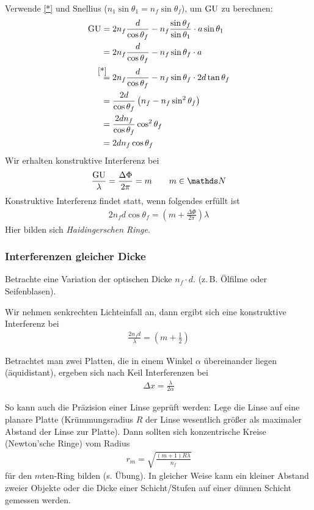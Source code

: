 Verwende \eqref{*} und Snellius ($n_1\sin\theta_1 = n_f\sin\theta_f$),
um $\operatorname{GU}$ zu berechnen:
\begin{align*}
  \GU &= 2 n_f\frac{d}{\cos\theta_f} 
        - n_f\frac{\sin\theta_f}{\sin\theta_1} \cdot a\sin\theta_1\\
      &= 2 n_f\frac{d}{\cos\theta_f} - n_f\sin\theta_f \cdot a\\
      &\overset{\mathllap{\eqref{*}}}{=} 
        2 n_f\frac{d}{\cos\theta_f} - n_f\sin\theta_f \cdot 2d\tan\theta_f\\
      &= \frac{2d}{\cos\theta_f}\left( n_f-n_f\sin^2\theta_f\right)\\
      &= \frac{2dn_f}{\cos\theta_f}\cos^2\theta_f\\
      &= 2dn_f\cos\theta_f
\end{align*}
Wir erhalten konstruktive Interferenz bei
\begin{gather*}
  \frac{\GU}{\lambda} = \frac{\Delta\Phi}{2\pi} = m 
  \qquad m\in\N
\end{gather*}
Konstruktive Interferenz findet statt, wenn folgendes erfüllt ist
\begin{gather*}
  2n_f d\cos\theta_f = \left( m+\frac{\Delta\Phi}{2\pi} \right)\lambda
\end{gather*}
Hier bilden sich \emph{Haidingerschen Ringe}.


\subsubsection{Interferenzen gleicher Dicke}
Betrachte eine Variation der optischen Dicke $n_f\cdot d$.
(z.\,B. Ölfilme oder Seifenblasen).

Wir nehmen senkrechten Lichteinfall an, dann ergibt sich eine
konstruktive Interferenz bei
\begin{gather*}
  \frac{2 n_f d}{\lambda} = (m+\frac{1}{2})
\end{gather*}

Betrachtet man zwei Platten, die in einem Winkel $\alpha$ übereinander
liegen (äquidistant), ergeben sich nach Keil Interferenzen bei
\begin{gather*}
  \Delta x = \frac{\lambda}{2\alpha}
\end{gather*}

So kann auch die Präzision einer Linse geprüft werden: Lege die Linse
auf eine planare Platte (Krümmungsradius $R$ der Linse wesentlich
größer als maximaler Abstand der Linse zur Platte).
Dann sollten sich konzentrische Kreise (Newton'sche Ringe) vom Radius
\begin{gather*}
  r_m = \sqrt{\frac{(m+1)R\lambda}{n_f}}
\end{gather*}
für den $m$ten-Ring bilden (s. Übung).
In gleicher Weise kann ein kleiner Abstand zweier Objekte oder die
Dicke einer Schicht/Stufen auf einer dünnen Schicht gemessen werden.

